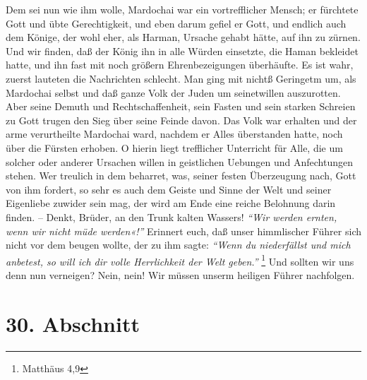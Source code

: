 Dem sei nun wie ihm wolle, Mardochai war ein vortrefflicher Mensch; er fürchtete
Gott und übte Gerechtigkeit, und eben darum gefiel er Gott, und endlich auch dem
Könige, der wohl eher, als Harman, Ursache gehabt hätte, auf ihn zu zürnen. Und
wir finden, daß der König ihn in alle Würden einsetzte, die Haman bekleidet
hatte, und ihn fast mit noch größern Ehrenbezeigungen überhäufte. Es ist wahr,
zuerst lauteten die Nachrichten schlecht. Man ging mit nichtß Geringetm um, als
Mardochai selbst und daß ganze Volk der Juden um seinetwillen auszurotten. Aber
seine Demuth und Rechtschaffenheit, sein Fasten und sein starken
Schreien zu
Gott trugen den Sieg über seine Feinde davon. Das Volk war erhalten und der arme
verurtheilte Mardochai ward, nachdem er Alles überstanden hatte, noch über die
Fürsten erhoben. O hierin liegt trefflicher Unterricht für Alle, die um solcher
oder anderer Ursachen willen in geistlichen Uebungen und Anfechtungen stehen.
Wer treulich in dem beharret, was, seiner festen Überzeugung
nach, Gott von ihm
fordert, so sehr es auch dem Geiste und Sinne der
Welt und seiner Eigenliebe
zuwider sein mag, der wird am Ende eine reiche Belohnung darin
finden. -- Denkt,
Brüder, an den Trunk kalten Wassers!
\textit{"`Wir werden ernten, wenn wir nicht müde
werden«!"'} Erinnert euch, daß unser himmlischer Führer sich nicht vor dem
beugen
wollte, der zu ihm sagte:
\textit{"`Wenn du niederfällst und mich anbetest, so will ich
dir volle Herrlichkeit der Welt geben."'}
\footnote{Matthäus 4,9}
Und sollten wir
uns denn nun verneigen? Nein, nein! Wir müssen unserm heiligen Führer
nachfolgen.

\section{30. Abschnitt} \label{kap9_ab30}

